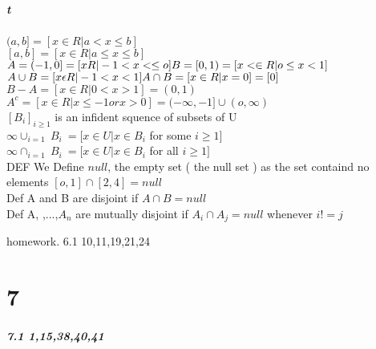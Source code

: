 \documentclass[10pt,letterpaper]{report}
\begin{document}
{\paragraph{t } $ ( a , b ] = [ x \in R | a < x \leq b ] $\\ $ [a,b] = [x \in R | a \leq x \leq b]$ \\ $ A = ( -1,0] = [ x R | -1< x <\leq o ] \\ B = [ 0,1) = [x < \in R | o \leq x < 1 ]$  \\$ A \cup B = [ x \epsilon R | -1 < x < 1] \\ A \cap B = [ x \in R | x = 0 ] = [0] $ \\ $ B -A = [ x \in R | 0 < x > 1 ] = ( 0,1)$ \\ $ A^c = [ x \in R | x \leq -1 or x > 0 ] = ( - \infty , -1 ] \cup ( o, \infty ) $ \\ $ [B_i]_{i \geq 1 }  $ is an infident squence of subsets of U  \\ $ \infty \cup_{i=1} \ B_i \ = [ x \in U | x \in B_i $ for some $ i \geq 1 ] $ \\$ \infty \cap_{i=1} \ B_i \ = [ x \in U | x \in B_i $ for all $ i \geq 1 ] $ \\ DEF We Define $ null $, the empty set ( the null set ) as the set containd no elements $ [o , 1] \cap [2 , 4 ] = null $ \\ Def A and B are disjoint if $ A \cap B = null$ \\ Def A, ,...,$A_n $ are mutually disjoint if $ A_i \cap A_j = null$ whenever $ i != j$
\par{homework. 6.1 10,11,19,21,24}
\chapter{7}
\paragraph{7.1 1,15,38,40,41}
}
\end{document}
